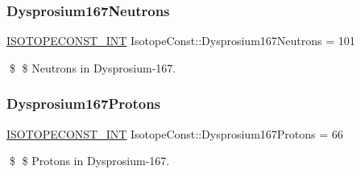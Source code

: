 \subsubsection{\texorpdfstring{Dysprosium167\+Neutrons}{Dysprosium167Neutrons}}
{\footnotesize\ttfamily \mbox{\hyperlink{group___isotope_const-_macros_ga5f18360b3e99483a35c32d789e62621c}{I\+S\+O\+T\+O\+P\+E\+C\+O\+N\+S\+T\+\_\+\+I\+NT}} Isotope\+Const\+::\+Dysprosium167\+Neutrons = 101}

\$ \$ Neutrons in Dysprosium-\/167. \mbox{\label{group___isotope_const-_dysprosium-_dy167_gabb497876e1d0bdf8cf343c537a3b9ab1}} 
\subsubsection{\texorpdfstring{Dysprosium167\+Protons}{Dysprosium167Protons}}
{\footnotesize\ttfamily \mbox{\hyperlink{group___isotope_const-_macros_ga5f18360b3e99483a35c32d789e62621c}{I\+S\+O\+T\+O\+P\+E\+C\+O\+N\+S\+T\+\_\+\+I\+NT}} Isotope\+Const\+::\+Dysprosium167\+Protons = 66}

\$ \$ Protons in Dysprosium-\/167. 